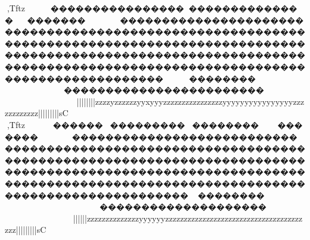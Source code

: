 {{{{{{{{{{{{{{{{{{{{{{{{{{{{{{{{{{{{{{{{{{{{{{{{{{{{{{{{{{{{{{{{{{{{{{{{{{{{{{{{{{{{{{{{{{{{{{{{{{{{{{{{{{{{{{{{{{{{{{{{{{{{{{{{{{{{{{{{{{{{{{{{{{{{{{{{{{{{{{{{{{{{{{{{{{{{{{{{{{{{{{{{{{{{{{{{{{{{{{{{{{{{{{{{{{{{{{{{{{{{{{{{{{{{{{{{{{{{{{{{{{{{{{{{{{{{{{{{{{{{{{{{{{{{{{{{{{{{{{{{{{{{{{{{{{{{{{{{{{{{{{{{{{{{{{{{{{{{{{{{{{{{{{{{{{{{{{{{{{{{{{{{{{{{{{{{{{{{{{{{{{{{{{{{{{{{{{{{{{{{{{{{{{{{{{{{{{{{{{{{{{{{{{{{{{{{{{{{{{{{{{{{{{{{{{{{{{{{{{{{{{{{{{{{{{{{{{{{{{{{{{{{{{{{{{{{{{{{{{{{{{{{{{{{{{{{{{{{{{{{{{{{{{{{{{{{{{{{{{{{{{{{{{{{{{{{{{{{{{{{{{{{{{{{{{{{{{{{{{{{{{{{{{{{{{{{{{{{{{{{{{{{{{{{{{{{{{{{{{{{{{{{{{{{{{{{{{{{{{{{{{{{{{{{{{{{{{{{{{{{{{{{{{{{{{{{{{{{{{{{{{{{{{{{{{{{{{{{{{{{{{{{{{{{{{{{{{{{{{{{{{{{{{{{{{{{{{{{{{{{{{{{{{{{{{{{{{{{{{{{{{{{{{{{{{{{{{{{{{{{{{{{{{{{{{{{{{{{{{{{{{{{{{{{{{{{{{{{{{{{{{{{{{{{{{{{{{{{{{{{{{{{{{{{{{{{{{{{{{{{{{{{{{{{{{{{{{{{{{{{{{{{{{{{{{{{{{{{{{{{{{{{{{{{{{{{{{{{{{{{{{{{{{{{{{{{{{{{{{{{{{{{{{{{{{{{{{{{{{{{{{{{{{{{{{{{{{{{{{{{{{{{{{{{{{{{{{{{{{{{{{{{{{{{{{{{{{{{{{{{{{{{{{{{{{{{{{{{{{{{{{{{{{{{{{{{{{{{{{{{{{{{{{{{{{{{{{{{{{{{{{{{{{{{{{{{{{{{{{{{{{{{{{{{{{{{,Tftz~~~~~�������������������������������������}~~~~~~}}�������������������������������������������������������������������������������������������������������������������������������������������������������������������������������������������������~~~~~~~~������������������������~~~~~~~~~~~~~~~~~~~~~~|||||}}}}|||{{{{{{{{{{{{{zzzzyzzzzzzyyxyyyzzzzzzzzzzzzzzzzyyyyyyyyyyyyyyyyzzzzzzzzzzzz{{{{|||||||||sC
,Tftz~~~~~������������������������������~~}}~~~~}~���������������������������������������������������������������������������������������������������������������������������������������������������������������������������������������������������������~~~~~~~~~~~~~~~~��������������������~~~~~~~~~~~~~~~~~~~~|||}}}}}}|||{{{{{{{{{{zzzzzzzzzzzzzzyyyyyyzzzzzzzzzzzzzzzzzzzzzzzzzzzzzzzzzzzzzzzz{{{{{{{{|||||||||sC
}}}}}}}}}}}}}}}}}}}}}}}}}}}}}}}}}}}}}}}}}}}}}}}}}}}}}}}}}}}}}}}}}}}}}}}}}}}}}}}}}}}}}}}}}}}}}}}}}}}}}}}}}}}}}}}}}}}}}}}}}}}}}}}}}}}}}}}}}}}}}}}}}}}}}}}}}}}}}}}}}}}}}}}}}}}}}}}}}}}}}}}}}}}}}}}}}}}}}}}}}}}}}}}}}}}}}}}}}}}}}}}}}}}}}}}}}}}}}}}}}}}}}}}}}}}}}}}}}}}}}}}}}}}}}}}}}}}}}}}}}}}}}}}}}}}}}}}}}}}}}}}}}}}}}}}}}}}}}}}}}}}}}}}}}}}}}}}}}}}}}}}}}}}}}}}}}}}}}}}}}}}}}}}}}}}}}}}}}}}}}}}}}}}}}}}}}}}}}}}}}}}}}}}}}}}}}}}}}}}}}}}}}}}}}}}}}}}}}}}}}}}}}}}}}}}}}}}}}}}}}}}}}}}}}}}}}}}}}}}}}}}}}}}}}}}}}}}}}}}}}}}}}}}}}}}}}}}}}}}}}}}}}}}}}}}}}}}}}}}}}}}}}}}}}}}}}}}}}}}}}}}}}}}}}}}}}}}}}}}}}}}}}}}}}}}}}}}}}}}}}}}}}}}}}}}}}}}}}}}}}}}}}}}}}}}}}}}}}}}}}}}}}}}}}}}}}}}}}}}}}}}}}}}}}}}}}}}}}}}}}}}}}}}}}}}}}}}}}}}}}}}}}}}}}}}}}}}}}}}}}}}}}}}}}}}}}}}}}}}}}}}}}}}}}}}}}}}}}}}}}}}}}}}}}}}}}}}}}}}}}}}}}}}}}}}}}}}}}}}}}}}}}}}}}}}}}}}}}}}}}}}}}}}}}}}}}}}}}}}}}}}}}}}}}}}}}}}}}}}}}}}}}}}}}}}}}}}}}}}}}}}}}}}}}}}}}}}}}}}}}}}}}}}}}}}}}}}}}}}}}}}}}}}}}}}}}}}}}}}}}}}}}}}}}}}}}}}}}}}}}}}}}}}}}}}}}}}}}}}}}}}}}}}}}}}}}}}}}}}}}}}}}}}}}}}}}}}}}}}}}}}}}}}}}}}}}}}}}}}}}}}}}}}}}}}}}}}}}}}}}}}}}}}}}}}}}}}}}}}}}}}}}}}}}}}}}}}}}}}}}}}}}}}}}}}
